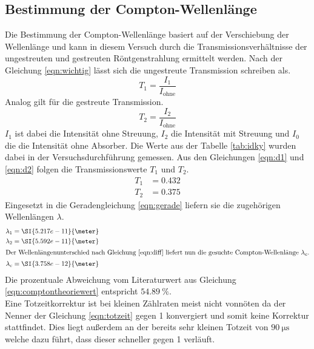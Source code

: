 \subsection{Bestimmung der Compton-Wellenlänge}
Die Bestimmung der Compton-Wellenlänge basiert auf der Verschiebung der Wellenlänge und kann in diesem Versuch durch die Transmissionsverhältnisse
der ungestreuten und gestreuten Röntgenstrahlung ermittelt werden. Nach der Gleichung \eqref{eqn:wichtig} lässt sich die ungestreute Transmission schreiben als.
\begin{equation}
\label{eqn:d1}
T_{1} = \frac{I_{1}}{I_{\text{ohne}}}
\end{equation}
Analog gilt für die gestreute Transmission.
\begin{equation}
\label{eqn:d2}
T_{2} = \frac{I_{2}}{I_{\text{ohne}}}
\end{equation}
$I_{1}$ ist dabei die Intensität ohne Streuung, $I_{2}$ die Intensität mit Streuung  und $I_{0}$ die die Intensität ohne Absorber.
Die Werte aus der Tabelle \ref{tab:idky} wurden dabei in der Versuchsdurchführung gemessen.
Aus den Gleichungen \eqref{eqn:d1} und \eqref{eqn:d2} folgen die Transmissionswerte $T_{1}$ und $T_{2}$.
\begin{align*}
T_{1} &= 0.432 \\
T_{2} &= 0.375
\end{align*}
Eingesetzt in die Geradengleichung \eqref{eqn:gerade} liefern sie die zugehörigen Wellenlängen $\lambda$.
\begin{align}
\lambda_{1} &=  \SI{5.217e-11}{\meter} \\
\lambda_{2} &=  \SI{5.592e-11}{\meter} \\
\intertext{Der Wellenlängenunterschied nach Gleichung \eqref{eqn:diff} liefert nun die gesuchte Compton-Wellenlänge $\lambda_{c}$.}
\lambda_{c} &= \SI{3.758e-12}{\meter} 
\end{align}
Die prozentuale Abweichung vom Literaturwert aus Gleichung \eqref{eqn:comptontheoriewert} entspricht $\SI{54.89}{\percent}$.
\\
Eine Totzeitkorrektur ist bei kleinen Zählraten meist nicht vonnöten da der Nenner der Gleichung \eqref{eqn:totzeit} gegen 1 konvergiert und somit keine
Korrektur stattfindet. Dies liegt außerdem an der bereits sehr kleinen Totzeit von $\SI{90}{\micro\second}$ welche dazu führt, dass dieser schneller gegen 1 verläuft.
